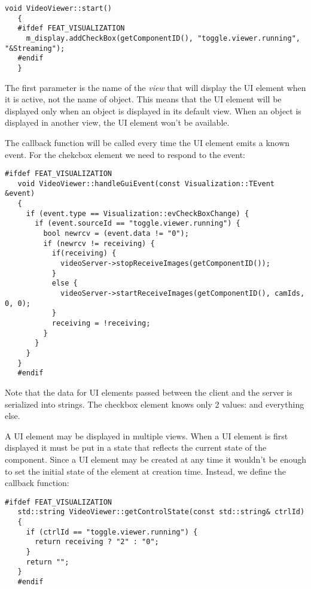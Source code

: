 \begin{Verbatim}[fontsize=\scriptsize,gobble=3]
   void VideoViewer::start()
   {
   #ifdef FEAT_VISUALIZATION
     m_display.addCheckBox(getComponentID(), "toggle.viewer.running", "&Streaming");
   #endif
   }
\end{Verbatim}

The first parameter is the name of the {\em view} that will display the UI
element when it is active, not the name of object. This means that the UI
element will be displayed only when an object is displayed in its default view.
When an object is displayed in another view, the UI element won't be available.

The  callback function will be called every time the
UI element emits a known event. For the chekcbox element we need to respond
to the  event:

\begin{Verbatim}[fontsize=\scriptsize,gobble=3]
   #ifdef FEAT_VISUALIZATION
   void VideoViewer::handleGuiEvent(const Visualization::TEvent &event)
   {
     if (event.type == Visualization::evCheckBoxChange) {
       if (event.sourceId == "toggle.viewer.running") {
         bool newrcv = (event.data != "0");
         if (newrcv != receiving) {
           if(receiving) {
             videoServer->stopReceiveImages(getComponentID());
           }
           else {
             videoServer->startReceiveImages(getComponentID(), camIds, 0, 0);
           }
           receiving = !receiving;
         }
       }
     }
   }
   #endif
\end{Verbatim}

Note that the data for UI elements passed between the client and the server is
serialized into strings. The checkbox element knows only 2 values: 
and everything else.

A UI element may be displayed in multiple views. When a UI element is first
displayed it must be put in a state that reflects the current state of the
component.  Since a UI element may be created at any time it wouldn't be enough
to set the initial state of the element at creation time. Instead, we define
the  callback function:

\begin{Verbatim}[fontsize=\scriptsize,gobble=3]
   #ifdef FEAT_VISUALIZATION
   std::string VideoViewer::getControlState(const std::string& ctrlId)
   {
     if (ctrlId == "toggle.viewer.running") {
       return receiving ? "2" : "0";
     }
     return "";
   }
   #endif
\end{Verbatim}

